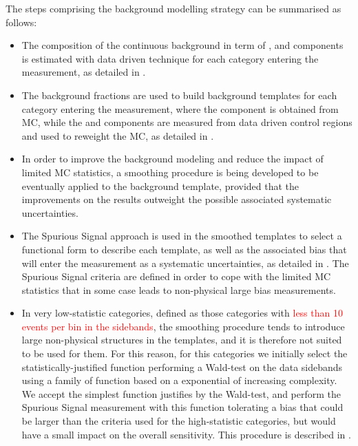 The steps comprising the background modelling strategy can be summarised as follows:
\begin{itemize}

  \item The composition of the continuous background in term of \yy, \yjet and \jetjet components is estimated with data driven technique for each category entering the measurement, as detailed in \Sect{\ref{ssec:bkg_composition}}.
  \item The background fractions are used to build \myy background templates for each category entering the measurement, where the \yy component is obtained from MC, while the \yjet and \jetjet components are measured from data driven control regions and used to reweight the \yy MC, as detailed in \Sect{\ref{ssec:bkg_templates}}.

  \item In order to improve the background modeling and reduce the impact of limited MC statistics, a smoothing procedure is being developed to be eventually applied to the background template, provided that the improvements on the results outweight the possible associated systematic uncertainties. 

  \item The Spurious Signal approach is used in the smoothed \yy templates to select a functional form to describe each template, as well as the associated bias that will enter the measurement as a systematic uncertainties, as detailed in \Sect{\ref{ssec:spurious_signal}}. The Spurious Signal criteria are defined in order to cope with the limited MC statistics that in some case leads to non-physical large bias measurements.

  \item In very low-statistic categories, defined as those categories with \textcolor{red}{less than 10 events per bin in the \myy sidebands}, the smoothing procedure tends to introduce large non-physical structures in the templates, and it is therefore not suited to be used for them. For this reason, for this categories we initially select the statistically-justified function performing a Wald-test on the data sidebands using a family of function based on a exponential of increasing complexity. We accept the simplest function justifies by the Wald-test, and perform the Spurious Signal measurement with this function tolerating a bias that could be larger than the criteria used for the high-statistic categories, but would have a small impact on the overall sensitivity. This procedure is described in \Sect{\ref{sssec:bkg_functions}}. 

\end{itemize}


